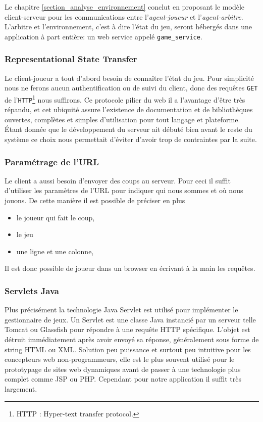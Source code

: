Le chapitre \ref{section_analyse_environnement} conclut en proposant le modèle client-serveur pour les communications entre l'\emph{agent-joueur} et l'\emph{agent-arbitre}. L'arbitre et l'environnement, c'est à dire l'état du jeu, seront hébergés dans une application à part entière: un \og web service \fg{} appelé \texttt{game\_service}.
 
\subsubsection{\og Representational State Transfer \fg{} }

Le client-joueur a tout d'abord besoin de connaître l'état du jeu. Pour simplicité nous ne ferons aucun authentification ou de suivi du client, donc des requêtes \texttt{GET} de l'\texttt{HTTP}\footnote{ HTTP : Hyper-text transfer protocol. } nous suffirons. Ce protocole pilier du web il a l'avantage d'être très répandu, et cet ubiquité assure l'existence de documentation et de  bibliothèques ouvertes, complètes et simples d'utilisation pour tout langage et plateforme. 
Étant donnée que le développement du serveur ait débuté bien avant le reste du système ce choix nous permettait d'éviter d'avoir trop de contraintes par la suite.

\subsubsection{ Paramétrage de l'URL }

Le client a aussi besoin d'envoyer des coups au serveur. Pour ceci il suffit d'utiliser les paramètres de l'URL pour indiquer qui nous sommes et où nous jouons. De cette manière il est possible de préciser en plus 
\begin{itemize}
\item le joueur qui fait le coup,
\item le jeu
\item une ligne et une colonne,
\end{itemize}
Il est donc possible de joueur dans un browser en écrivant à la main les requêtes.

\subsubsection{Servlets Java}
Plus précisément la technologie Java Servlet est utilisé pour implémenter le gestionnaire de jeux. Un Servlet est une classe Java instancié par un serveur telle Tomcat ou Glassfish pour répondre à une requête HTTP spécifique. L'objet est détruit immédiatement après avoir envoyé sa réponse, généralement sous forme de string HTML ou XML.
Solution peu puissance et surtout peu intuitive pour les concepteurs web non-programmeurs, elle est le plus souvent utilisé pour le prototypage de sites web dynamiques avant de passer à une technologie plus complet comme JSP ou PHP. Cependant pour notre application il suffit très largement.